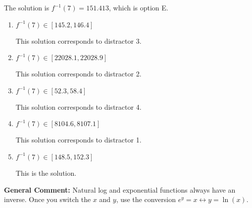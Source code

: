 \documentclass{extbook}[14pt]
\begin{document}
\begin{enumerate}
{The solution is \( f^{-1}(7) = 151.413 \), which is option E.\begin{enumerate}[label=\Alph*.]
\item \( f^{-1}(7) \in [145.2, 146.4] \)

 This solution corresponds to distractor 3.
\item \( f^{-1}(7) \in [22028.1, 22028.9] \)

 This solution corresponds to distractor 2.
\item \( f^{-1}(7) \in [52.3, 58.4] \)

 This solution corresponds to distractor 4.
\item \( f^{-1}(7) \in [8104.6, 8107.1] \)

 This solution corresponds to distractor 1.
\item \( f^{-1}(7) \in [148.5, 152.3] \)

 This is the solution.
\end{enumerate}

\textbf{General Comment:} Natural log and exponential functions always have an inverse. Once you switch the $x$ and $y$, use the conversion $ e^y = x \leftrightarrow y=\ln(x)$.
}
\end{enumerate}
\end{document}
